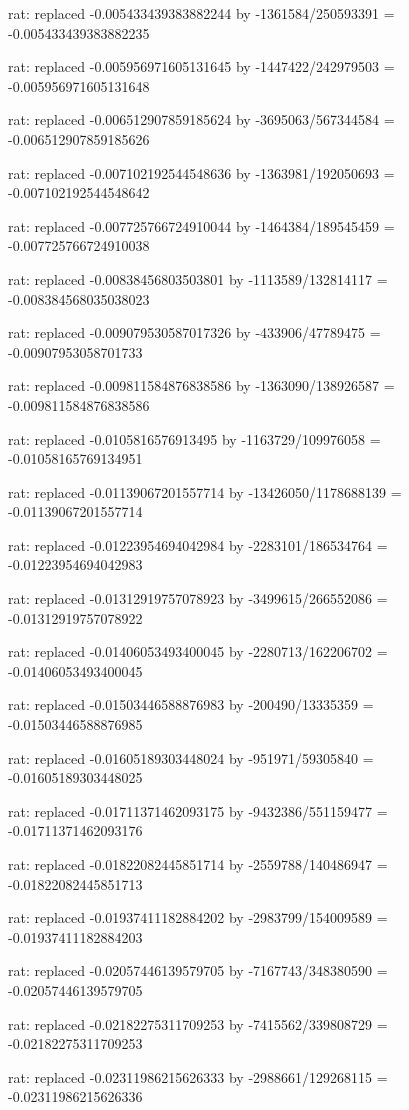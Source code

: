 \documentclass[a4paper,10pt]{article}
\begin{document}
\begin{eulernotebook}
\begin{eulercomment}
\begin{eulercomment}
\begin{eulercomment}
\begin{eulercomment}
\begin{eulercomment}
\begin{eulercomment}
\begin{eulercomment}
\begin{eulercomment}
\begin{eulercomment}
\begin{eulercomment}
\begin{eulercomment}
\begin{eulercomment}
\begin{eulercomment}
\begin{eulercomment}
\begin{eulercomment}
\begin{eulercomment}
\begin{euleroutput}
  rat: replaced -0.005433439383882244 by -1361584/250593391 = -0.005433439383882235
  
  rat: replaced -0.005956971605131645 by -1447422/242979503 = -0.005956971605131648
  
  rat: replaced -0.006512907859185624 by -3695063/567344584 = -0.006512907859185626
  
  rat: replaced -0.007102192544548636 by -1363981/192050693 = -0.007102192544548642
  
  rat: replaced -0.007725766724910044 by -1464384/189545459 = -0.007725766724910038
  
  rat: replaced -0.00838456803503801 by -1113589/132814117 = -0.008384568035038023
  
  rat: replaced -0.009079530587017326 by -433906/47789475 = -0.00907953058701733
  
  rat: replaced -0.009811584876838586 by -1363090/138926587 = -0.009811584876838586
  
  rat: replaced -0.0105816576913495 by -1163729/109976058 = -0.01058165769134951
  
  rat: replaced -0.01139067201557714 by -13426050/1178688139 = -0.01139067201557714
  
  rat: replaced -0.01223954694042984 by -2283101/186534764 = -0.01223954694042983
  
  rat: replaced -0.01312919757078923 by -3499615/266552086 = -0.01312919757078922
  
  rat: replaced -0.01406053493400045 by -2280713/162206702 = -0.01406053493400045
  
  rat: replaced -0.01503446588876983 by -200490/13335359 = -0.01503446588876985
  
  rat: replaced -0.01605189303448024 by -951971/59305840 = -0.01605189303448025
  
  rat: replaced -0.01711371462093175 by -9432386/551159477 = -0.01711371462093176
  
  rat: replaced -0.01822082445851714 by -2559788/140486947 = -0.01822082445851713
  
  rat: replaced -0.01937411182884202 by -2983799/154009589 = -0.01937411182884203
  
  rat: replaced -0.02057446139579705 by -7167743/348380590 = -0.02057446139579705
  
  rat: replaced -0.02182275311709253 by -7415562/339808729 = -0.02182275311709253
  
  rat: replaced -0.02311986215626333 by -2988661/129268115 = -0.02311986215626336
  

\end{euleroutput}
\end{eulercomment}
\end{eulercomment}
\end{eulercomment}
\end{eulercomment}
\end{eulercomment}
\end{eulercomment}
\end{eulercomment}
\end{eulercomment}
\end{eulercomment}
\end{eulercomment}
\end{eulercomment}
\end{eulercomment}
\end{eulercomment}
\end{eulercomment}
\end{eulercomment}
\end{eulercomment}
\end{eulernotebook}
\end{document}
